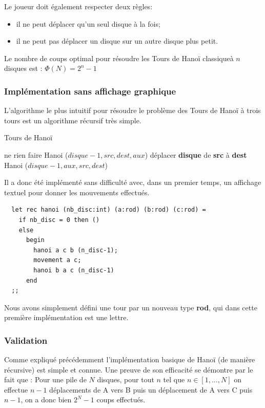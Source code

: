 \documentclass[a4paper,11pt]{article}
\begin{document}
Le joueur doit également respecter deux règles:
\begin{itemize}
\item il ne peut déplacer qu'un seul disque à la fois;
\item il ne peut pas déplacer un disque sur un autre disque plus petit.
\end{itemize}

Le nombre de coups optimal pour résoudre les Tours de Hanoï classiqueà $n$ disques est : \(\Phi(N) = 2^{n}-1\)

\subsubsection{Implémentation sans affichage graphique}
\label{sec:algoBase}
L'algorithme le plus intuitif pour résoudre le problème des Tours de Hanoï à trois tours
est un algorithme récursif très simple.

\begin{algorithm}
  \caption{Tours de Hanoï}\label{algo:hanoi1}
  \begin{algorithmic}[1]
     
    ne rien faire
    \Else
    \State Hanoi ($disque - 1, src, dest, aux$)
    \State déplacer \textbf{disque} de \textbf{src} à \textbf{dest}
    \State Hanoi ($disque - 1, aux, src, dest$)
    \EndIf
    \EndProcedure
\end{algorithmic}
\end{algorithm}

Il a donc été implémenté sans difficulté avec, dans un premier temps,  un affichage textuel pour donner les mouvements effectués.
\begin{lstlisting}
  let rec hanoi (nb_disc:int) (a:rod) (b:rod) (c:rod) =
    if nb_disc = 0 then ()
    else
      begin
        hanoi a c b (n_disc-1);
        movement a c;
        hanoi b a c (n_disc-1)
      end
  ;;
\end{lstlisting}

Nous avons simplement défini une tour par un nouveau type \textbf{rod}, qui dans cette première implémentation est une lettre.

\subsubsection{Validation}

Comme expliqué précédemment l'implémentation basique de Hanoï (de manière récursive) est simple et connue.
Une preuve de son efficacité se démontre par le fait que :
Pour une pile de $N$ disques, pour tout $n$ tel que $n \in [1,...,N]$ on effectue $n-1$ déplacements de A vers B puis un déplacement de A vers C puis $n-1$, on a donc bien $2^{N} - 1$ coups effectués.
\end{document}
